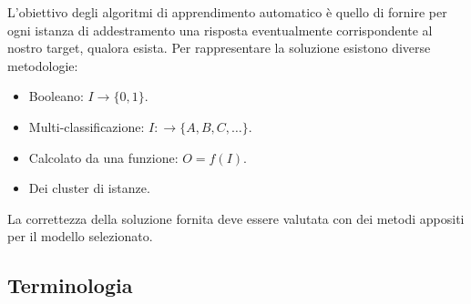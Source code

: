 L'obiettivo degli algoritmi di apprendimento automatico è quello di fornire per ogni istanza di addestramento una risposta eventualmente corrispondente al nostro target, qualora esista. Per rappresentare la soluzione esistono diverse metodologie:
\begin{itemize}
    \item Booleano: $I \to \{0, 1\}$.
    \item Multi-classificazione: $I: \to \{A, B, C, \dots\}$.
    \item Calcolato da una funzione: $O = f(I)$.
    \item Dei cluster di istanze.
\end{itemize}

La correttezza della soluzione fornita deve essere valutata con dei metodi appositi per il modello selezionato.
\subsection{Terminologia}
